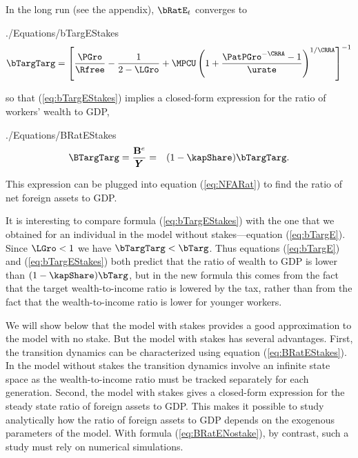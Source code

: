 \documentclass[titlepage]{\econtex}\newcommand{\texname}{cjSOE}
\renewcommand{\GDPLev}{\ensuremath{\pmb{Y}}}
\begin{document}
\hypertarget{bTargEStakes}{}
In the long run (see the appendix), $\bRatE_t$ converges to
\begin{verbatimwrite}{./Equations/bTargEStakes}
\begin{equation}
 \bTargTarg = \left[\frac{\PGro}{\Rfree}-\frac{1}{2-\LGro}+\MPCU \left(1+\frac{\PatPGro^{-\CRRA}-1}{\urate}\right)^{1/\CRRA}\right]^{-1}
\label{eq:bTargEStakes}
\end{equation}
\end{verbatimwrite}

so that (\ref{eq:bTargEStakes}) implies a closed-form expression for the ratio of workers' wealth to GDP,\hypertarget{BRatEStakes}{}
\begin{verbatimwrite}{./Equations/BRatEStakes}
\begin{eqnarray}
\BTargTarg = \frac{\BLevE}{\GDPLev} & = & (1-\kapShare ) \bTargTarg.
\label{eq:BRatEStakes}
\end{eqnarray}
\end{verbatimwrite}

This expression can be plugged into equation (\ref{eq:NFARat}) to find the ratio of net foreign assets to GDP.

It is interesting to compare formula (\ref{eq:bTargEStakes}) with the
one that we obtained for an individual in the model without
stakes---equation (\ref{eq:bTargE}). Since $\LGro<1$ we have
$\bTargTarg < \bTarg$. Thus
equations (\ref{eq:bTargE}) and (\ref{eq:bTargEStakes}) both predict
that the ratio of wealth to GDP is lower than $(1-\kapShare)
\bTarg$, but in the new formula this comes from the
fact that the target wealth-to-income ratio is lowered by the tax,
rather than from the fact that the wealth-to-income ratio is lower for
younger workers.

We will show below that the model with stakes provides a good
approximation to the model with no stake.  But the model with stakes has
several advantages. First, the transition dynamics can be
characterized using equation (\ref{eq:BRatEStakes}). In the model
without stakes the transition dynamics involve an infinite state space
as the wealth-to-income ratio must be tracked separately for each
generation. Second, the model with stakes gives a closed-form
expression for the steady state ratio of foreign assets to GDP. This
makes it possible to study analytically how the ratio of foreign
assets to GDP depends on the exogenous parameters of the model. With
formula (\ref{eq:BRatENostake}), by contrast, such a study must rely
on numerical simulations.
\end{document}
